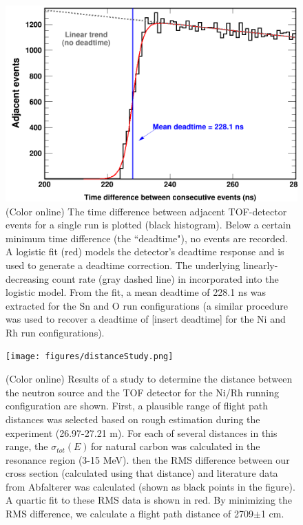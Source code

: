 \documentclass[twocolumn,secnumarabic,amssymb, nobibnotes, aps, prl,
superscriptaddress, nobalancelastpage]{revtex4}
\newcommand{\totEs}{\ensuremath{\sigma_{tot}(E)\,}}
\begin{document}
\begin{figure}
    \includegraphics[scale=0.24]{figures/TimeDifferenceBetweenEvents.png}
    \caption{(Color online) The time difference between adjacent TOF-detector
    events for a single run is plotted (black histogram). Below a certain
minimum time difference (the ``deadtime"), no events are recorded. A logistic
fit (red) models the detector's deadtime response and is used to generate a
deadtime correction. The underlying linearly-decreasing count rate (gray dashed
line) in incorporated into the logistic model. From the fit, a mean deadtime of
228.1 ns was extracted for the Sn and O run configurations (a similar
procedure was used to recover a deadtime of [insert deadtime] for the Ni and Rh
run configurations).}
    \label{TimeDifferenceBetweenEvents}
\end{figure}

\begin{figure}
    \texttt{[image: figures/distanceStudy.png]}
    \caption{(Color online) Results of a study to determine the distance between
    the neutron source and the TOF detector for the Ni/Rh running configuration
are shown. First, a plausible range of flight path distances was selected based
on rough estimation during the experiment (26.97-27.21 m). For each of several
distances in this range, the \totEs for natural carbon was calculated in the
resonance region (3-15 MeV). then the RMS difference between our cross section
(calculated using that distance) and literature data from Abfalterer
\cite{Abfalterer2000, Abfalterer2001} was calculated (shown as black points in
the figure). A quartic fit to these RMS data is shown in red. By minimizing the
RMS difference, we calculate a flight path distance of 2709$\pm$1 cm.}
    \label{DistanceStudy}
\end{figure}
\end{document}
